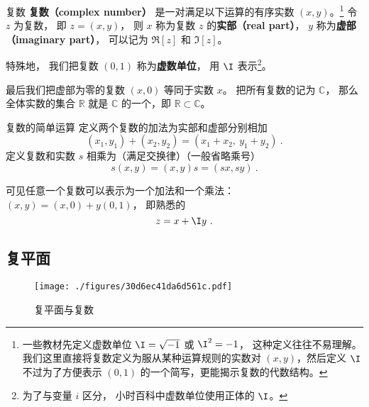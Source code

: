 

\begin{definition}{复数}
\textbf{复数（complex number）} 是一对满足以下运算的有序实数 $(x,y)$。\footnote{一些教材先定义虚数单位 $\I = \sqrt{-1}$ 或 $\I^2 = -1$， 这种定义往往不易理解。 我们这里直接将复数定义为服从某种运算规则的实数对 $(x,y)$，然后定义 $\I$ 不过为了方便表示 $(0,1)$ 的一个简写，更能揭示复数的代数结构\cite{Rudin}。} 令 $z$ 为复数， 即 $z = (x, y)$， 则 $x$ 称为复数 $z$ 的\textbf{实部（real part）}， $y$ 称为\textbf{虚部（imaginary part）}， 可以记为 $\Re[z]$ 和 $\Im[z]$。

特殊地， 我们把复数 $(0, 1)$ 称为\textbf{虚数单位}， 用 $\I$ 表示\footnote{为了与变量 $i$ 区分， 小时百科中虚数单位使用正体的 $\I$。}。

最后我们把虚部为零的复数 $(x, 0)$ 等同于实数 $x$。 把所有复数的记为 $\mathbb C$， 那么全体实数的集合 $\mathbb R$ 就是 $\mathbb C$ 的一个，即 $\mathbb R \subset \mathbb C$。
\end{definition}

\begin{definition}{复数的简单运算}
定义两个复数的加法为实部和虚部分别相加
\begin{equation}\label{eq_CplxNo_1}
(x_1, y_1) + (x_2, y_2) = (x_1+ x_2,\ y_1 + y_2)~.
\end{equation}
定义复数和实数 $s$ 相乘为（满足交换律）（一般省略乘号）
\begin{equation}\label{eq_CplxNo_4}
s(x, y) = (x, y)s = (sx, sy)~.
\end{equation}
\end{definition}

可见任意一个复数可以表示为一个加法和一个乘法： $(x, y) = (x, 0) + y(0, 1)$， 即熟悉的
\begin{equation}
z = x + \I y~.
\end{equation}

\subsection{复平面}
\begin{figure}[ht]
\centering
\texttt{[image: ./figures/30d6ec41da6d561c.pdf]}
\caption{复平面与复数} \label{fig_CplxNo_1}
\end{figure}


